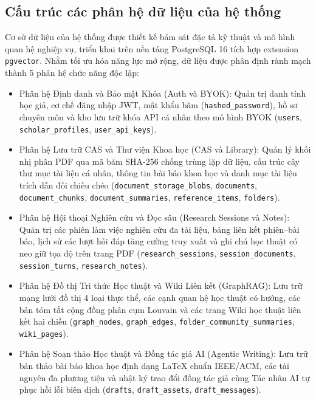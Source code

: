 \subsection{Cấu trúc các phân hệ dữ liệu của hệ thống}
\label{subsec:csdl_tong_quan}

Cơ sở dữ liệu của hệ thống \VS được thiết kế bám sát đặc tả kỹ thuật và mô hình quan hệ nghiệp vụ, triển khai trên nền tảng PostgreSQL 16 tích hợp extension \texttt{pgvector}. Nhằm tối ưu hóa năng lực mở rộng, dữ liệu được phân định rành mạch thành 5 phân hệ chức năng độc lập:
\begin{itemize}[noitemsep, topsep=2pt]
    \item Phân hệ Định danh và Bảo mật Khóa (Auth và BYOK): Quản trị danh tính học giả, cơ chế đăng nhập JWT, mật khẩu băm (\texttt{hashed\_password}), hồ sơ chuyên môn và kho lưu trữ khóa API cá nhân theo mô hình BYOK (\texttt{users}, \texttt{scholar\_profiles}, \texttt{user\_api\_keys}).
    \item Phân hệ Lưu trữ CAS và Thư viện Khoa học (CAS và Library): Quản lý khối nhị phân PDF qua mã băm SHA-256 chống trùng lặp dữ liệu, cấu trúc cây thư mục tài liệu cá nhân, thông tin bài báo khoa học và danh mục tài liệu trích dẫn đối chiếu chéo (\texttt{document\_storage\_blobs}, \texttt{documents}, \texttt{document\_chunks}, \texttt{document\_summaries}, \texttt{reference\_items}, \texttt{folders}).
    \item Phân hệ Hội thoại Nghiên cứu và Đọc sâu (Research Sessions và Notes): Quản trị các phiên làm việc nghiên cứu đa tài liệu, bảng liên kết phiên--bài báo, lịch sử các lượt hỏi đáp tăng cường truy xuất và ghi chú học thuật có neo giữ tọa độ trên trang PDF (\texttt{research\_sessions}, \texttt{session\_documents}, \texttt{session\_turns}, \texttt{research\_notes}).
    \item Phân hệ Đồ thị Tri thức Học thuật và Wiki Liên kết (GraphRAG): Lưu trữ mạng lưới đồ thị 4 loại thực thể, các cạnh quan hệ học thuật có hướng, các bản tóm tắt cộng đồng phân cụm Louvain và các trang Wiki học thuật liên kết hai chiều (\texttt{graph\_nodes}, \texttt{graph\_edges}, \texttt{folder\_community\_summaries}, \texttt{wiki\_pages}).
    \item Phân hệ Soạn thảo Học thuật và Đồng tác giả AI (Agentic Writing): Lưu trữ bản thảo bài báo khoa học định dạng LaTeX chuẩn IEEE/ACM, các tài nguyên đa phương tiện và nhật ký trao đổi đồng tác giả cùng Tác nhân AI tự phục hồi lỗi biên dịch (\texttt{drafts}, \texttt{draft\_assets}, \texttt{draft\_messages}).
\end{itemize}

